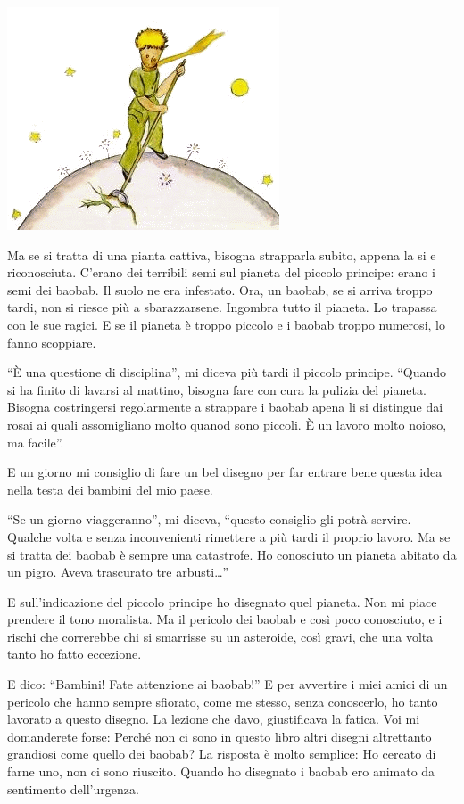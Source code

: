\documentclass[11pt]{scrbook}
\begin{document}
\begin{center}
\includegraphics{img/5b}
\end{center}

Ma se si tratta di una pianta cattiva, bisogna strapparla subito, appena
la si e riconosciuta. C'erano dei terribili semi sul pianeta del piccolo
principe: erano i semi dei baobab. Il suolo ne era infestato. Ora, un
baobab, se si arriva troppo tardi, non si riesce più a sbarazzarsene.
Ingombra tutto il pianeta. Lo trapassa con le sue ragici. E se il
pianeta è troppo piccolo e i baobab troppo numerosi, lo fanno scoppiare.

``È una questione di disciplina'', mi diceva più tardi il piccolo
principe. ``Quando si ha finito di lavarsi al mattino, bisogna fare con
cura la pulizia del pianeta. Bisogna costringersi regolarmente a
strappare i baobab apena li si distingue dai rosai ai quali assomigliano
molto quanod sono piccoli. È un lavoro molto noioso, ma facile''.

E un giorno mi consiglio di fare un bel disegno per far entrare bene
questa idea nella testa dei bambini del mio paese.

``Se un giorno viaggeranno'', mi diceva, ``questo consiglio gli potrà
servire. Qualche volta e senza inconvenienti rimettere a più tardi il
proprio lavoro. Ma se si tratta dei baobab è sempre una catastrofe. Ho
conosciuto un pianeta abitato da un pigro. Aveva trascurato tre
arbusti\ldots{}''

E sull'indicazione del piccolo principe ho disegnato quel pianeta. Non
mi piace prendere il tono moralista. Ma il pericolo dei baobab e così
poco conosciuto, e i rischi che correrebbe chi si smarrisse su un
asteroide, così gravi, che una volta tanto ho fatto eccezione.

E dico: ``Bambini! Fate attenzione ai baobab!'' E per avvertire i miei
amici di un pericolo che hanno sempre sfiorato, come me stesso, senza
conoscerlo, ho tanto lavorato a questo disegno. La lezione che davo,
giustificava la fatica. Voi mi domanderete forse: Perché non ci sono in
questo libro altri disegni altrettanto grandiosi come quello dei baobab?
La risposta è molto semplice: Ho cercato di farne uno, non ci sono
riuscito. Quando ho disegnato i baobab ero animato da sentimento
dell'urgenza.
\end{document}
